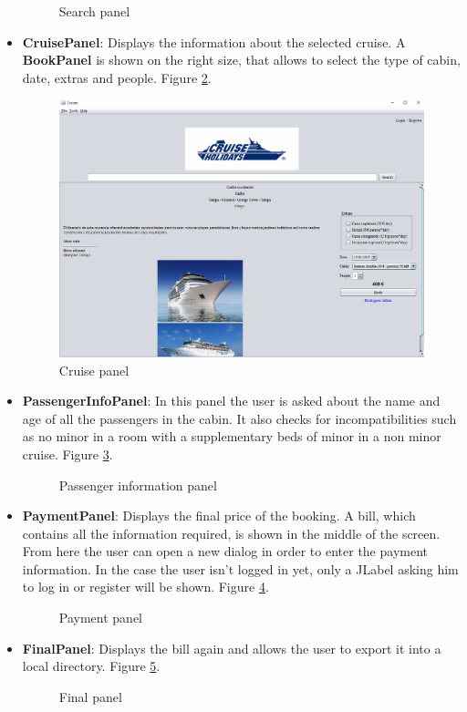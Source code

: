 \documentclass[11pt]{article}
\begin{document}
\begin{itemize}
\begin{figure}
			\caption{Search panel}
			\label{fig:search}
   	    \end{figure}
	    \item \textbf{CruisePanel}: Displays the information about the selected cruise. A \textbf{BookPanel} is shown on the right size, that allows to select the type of cabin, date, extras and people. Figure \ref{fig:cruise}.
	    \begin{figure}
			\includegraphics[width=\linewidth]{images/cruise.png}
			\caption{Cruise panel}
			\label{fig:cruise}
	    \end{figure}
   	    \item \textbf{PassengerInfoPanel}: In this panel the user is asked about the name and age of all the passengers in the cabin. It also checks for incompatibilities such as no minor in a room with a supplementary beds of minor in a non minor cruise. Figure \ref{fig:passenger}.
   	    \begin{figure}
	   	   	\caption{Passenger information panel}
	   	   	\label{fig:passenger}
   	    \end{figure}
   	    \item \textbf{PaymentPanel}: Displays the final price of the booking. A bill, which contains all the information required, is shown in the middle of the screen. From here the user can open a new dialog in order to enter the payment information. In the case the user isn't logged in yet, only a JLabel asking him to log in or register will be shown. Figure \ref{fig:payment}.
   	    \begin{figure}
	   	   	\caption{Payment panel}
	   	   	\label{fig:payment}
   	    \end{figure}
   	    \item \textbf{FinalPanel}: Displays the bill again and allows the user to export it into a local directory. Figure \ref{fig:final}.
   	    \begin{figure}
	   	   	\caption{Final panel}
	   	   	\label{fig:final}
   	    \end{figure}
   \end{itemize}   
   
\end{document}
